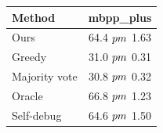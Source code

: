 \begin{tabular}{lc}
\toprule
Method & mbpp_plus \\
\midrule
Ours & 64.4 $\\pm$ 1.63 \\
Greedy & 31.0 $\\pm$ 0.31 \\
Majority vote & 30.8 $\\pm$ 0.32 \\
Oracle & 66.8 $\\pm$ 1.23 \\
Self-debug & 64.6 $\\pm$ 1.50 \\
\bottomrule
\end{tabular}
